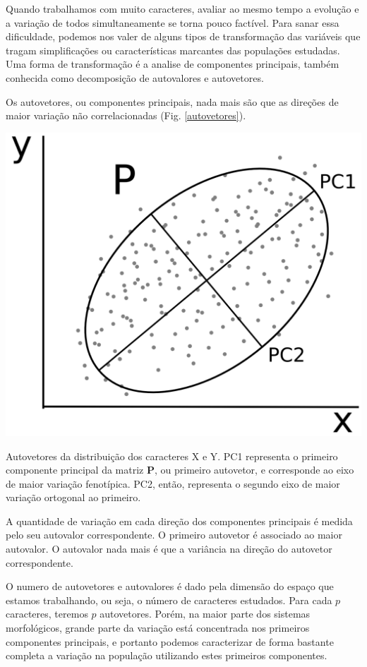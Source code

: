 \documentclass[portuges,]{tufte-handout}
\begin{document}
Quando trabalhamos com muito caracteres, avaliar ao mesmo tempo a
evolução e a variação de todos simultaneamente se torna pouco factível.
Para sanar essa dificuldade, podemos nos valer de alguns tipos de
transformação das variáveis que tragam simplificações ou características
marcantes das populações estudadas. Uma forma de transformação é a
analise de componentes principais, também conhecida como decomposição de
autovalores e autovetores.

Os autovetores, ou componentes principais, nada mais são que as direções
de maior variação não correlacionadas (Fig. \ref{autovetores}).

\begin{marginfigure}
\includegraphics{./figuras/auto-vetores.png}
\caption{Autovetores da distribuição dos caracteres X e Y. PC1
representa o primeiro componente principal da matriz \(\mathbf{P}\), ou
primeiro autovetor, e corresponde ao eixo de maior variação fenotípica.
PC2, então, representa o segundo eixo de maior variação ortogonal ao
primeiro.}
\label{autovetores}
\end{marginfigure}

A quantidade de variação em cada direção dos componentes principais é
medida pelo seu autovalor correspondente. O primeiro autovetor é
associado ao maior autovalor. O autovalor nada mais é que a variância na
direção do autovetor correspondente.

O numero de autovetores e autovalores é dado pela dimensão do espaço que
estamos trabalhando, ou seja, o número de caracteres estudados. Para
cada \(p\) caracteres, teremos \(p\) autovetores. Porém, na maior parte
dos sistemas morfológicos, grande parte da variação está concentrada nos
primeiros componentes principais, e portanto podemos caracterizar de
forma bastante completa a variação na população utilizando estes
primeiros componentes.
\end{document}
